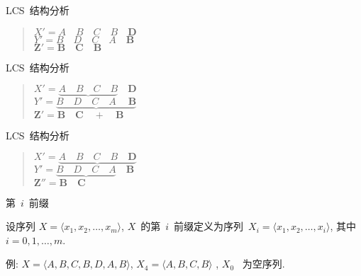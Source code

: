\documentclass[fontset=fandol,UTF8,fleqn]{beamer}
\begin{document}
\begin{frame}{LCS~结构分析}
\huge{
\begin{quote}
$ X' = A\quad B \quad C \quad B \quad \mathbf{D}$  \\ \pause
\vspace*{.5cm}
$ Y' = B\quad D \quad C \quad A \quad \mathbf{B}$   \\ \pause
\vspace*{1cm}
$\mathbf{ Z' = B\quad C \quad B}$  \\ 
\end{quote}
}
\end{frame}

\begin{frame}{LCS~结构分析}
\huge{
\begin{quote}
$ X' = \underbrace{A\quad B \quad C \quad B} \quad \mathbf{D} $  \\ \pause
\vspace*{.5cm}
$ Y' = \underbrace{B\quad D \quad C \quad A \quad\ \mathbf{B}} $   \\ \pause
\vspace*{1cm}
$\mathbf{ Z' = B\quad C \quad  + \quad B}$  \\ 
\end{quote}
}
\end{frame}

\begin{frame}{LCS~结构分析}
\huge{
\begin{quote}
$ X' = \underbrace{A\quad B \quad C \quad B \quad \mathbf{D}} $  \\ \pause
\vspace*{.5cm}
$ Y' = \underbrace{B\quad D \quad C \quad A }\quad \mathbf{B} $   \\ \pause
\vspace*{1cm}
$\mathbf{ Z'' = B\quad C}$  \\ 
\end{quote}
}
\end{frame}

\begin{frame}{第~$i$~前缀}
\begin{definition}[第~$i$~前缀] 设序列 $X = \langle x_1, x_2,\ldots,x_m \rangle$, $X$~的第~$i$~前缀定义为序列~$X_i =\langle x_1, x_2,\ldots , x_i\rangle$,  其中~ $i = 0, 1,\ldots,m$. 
\end{definition} \pause

例:   $X =\langle A, B, C, B,
  D, A, B\rangle$, $X_4 = \langle A, B, C, B\rangle$ , $X_0$
~为空序列.  
\end{frame}
\end{document}
